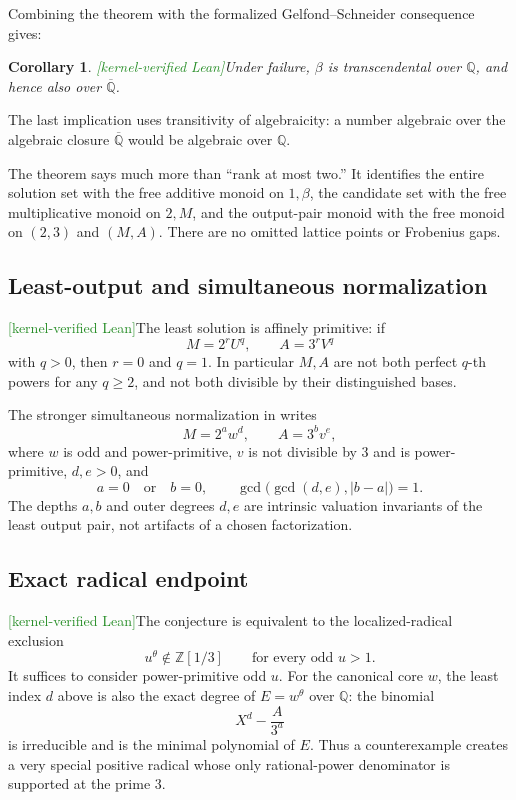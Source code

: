 \documentclass[11pt,oneside]{article}
\newtheorem{corollary}[theorem]{Corollary}
\theoremstyle{definition}
\newcommand{\Z}{\mathbb Z}
\newcommand{\Q}{\mathbb Q}
\newcommand{\Qbar}{\overline{\mathbb Q}}
\newcommand{\tagLean}{\textcolor{ForestGreen}{\textsf{[kernel-verified Lean]}}}
\newcommand{\lean}[1]{\texttt{\detokenize{#1}}}
\begin{document}
Combining the theorem with the formalized Gelfond--Schneider consequence gives:

\begin{corollary}\label{cor:beta-trans}
\tagLean Under failure, \(\beta\) is transcendental over \(\Q\), and hence also over
\(\Qbar\).
\end{corollary}

The last implication uses transitivity of algebraicity: a number algebraic over the
algebraic closure \(\Qbar\) would be algebraic over \(\Q\).

The theorem says much more than ``rank at most two.''  It identifies the entire solution
set with the free additive monoid on \(1,\beta\), the candidate set with the free
multiplicative monoid on \(2,M\), and the output-pair monoid with the free monoid on
\((2,3)\) and \((M,A)\).  There are no omitted lattice points or Frobenius gaps.

\subsection{Least-output and simultaneous normalization}

\tagLean The least solution is affinely primitive: if
\[
  M=2^rU^q,\qquad A=3^rV^q
\]
with \(q>0\), then \(r=0\) and \(q=1\).  In particular \(M,A\) are not both perfect
\(q\)-th powers for any \(q\ge2\), and not both divisible by their distinguished bases.

The stronger simultaneous normalization in \lean{OutputNormalization.lean} writes
\[
  M=2^aw^d,
  \qquad
  A=3^bv^e,
\]
where \(w\) is odd and power-primitive, \(v\) is not divisible by \(3\) and is
power-primitive, \(d,e>0\), and
\[
  a=0\quad\text{or}\quad b=0,
  \qquad
  \gcd\bigl(\gcd(d,e),|b-a|\bigr)=1.
\]
The depths \(a,b\) and outer degrees \(d,e\) are intrinsic valuation invariants of the
least output pair, not artifacts of a chosen factorization.

\subsection{Exact radical endpoint}

\tagLean The conjecture is equivalent to the localized-radical exclusion
\[
  u^\theta\notin\Z[1/3]
  \qquad\text{for every odd }u>1.
\]
It suffices to consider power-primitive odd \(u\).  For the canonical core \(w\), the
least index \(d\) above is also the exact degree of \(E=w^\theta\) over \(\Q\): the
binomial
\[
  X^d-\frac{A}{3^a}
\]
is irreducible and is the minimal polynomial of \(E\).  Thus a counterexample creates a
very special positive radical whose only rational-power denominator is supported at the
prime \(3\).
\end{document}
